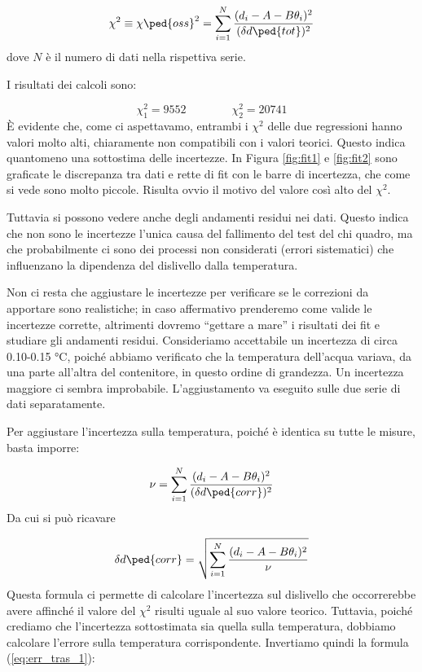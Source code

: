 \begin{equation}
    \chi^2 \equiv \chi\ped{oss}^2 = \sum_{i=1}^{N} \frac{(d_i - A - B\theta_i)^2}{(\delta d\ped{tot})^2}
    \label{eq:chi2}
\end{equation}
%
dove $N$ è il numero di dati nella rispettiva serie. 

I risultati dei calcoli sono:

\begin{equation}
    \chi_1^2 = 9552 \qquad \qquad \chi_2^2 = 20741
\end{equation}
%
\`E evidente che, come ci aspettavamo, entrambi i $\chi^2$ delle due regressioni hanno valori molto alti, chiaramente non compatibili con
i valori teorici. Questo indica quantomeno una sottostima delle incertezze. In Figura \ref{fig:fit1} e \ref{fig:fit2} sono
graficate le discrepanza tra dati e rette di fit con le barre di incertezza, che come si vede sono molto piccole. Risulta ovvio il motivo del
valore così alto del $\chi^2$.

Tuttavia si possono vedere anche degli andamenti residui nei dati. Questo indica che non sono le incertezze l'unica
causa del fallimento del test del chi quadro, ma che probabilmente ci sono dei processi non considerati (errori sistematici)
che influenzano la dipendenza del dislivello dalla temperatura.

Non ci resta che aggiustare le incertezze per verificare se le correzioni da apportare sono realistiche; in caso affermativo
prenderemo come valide le incertezze corrette, altrimenti dovremo ``gettare a mare'' i risultati dei fit e studiare gli
andamenti residui.
Consideriamo accettabile un incertezza di circa 0.10-0.15 \si{\celsius}, poiché abbiamo verificato che la temperatura dell'acqua
variava, da una parte all'altra del contenitore, in questo ordine di grandezza. Un incertezza maggiore ci sembra improbabile.
L'aggiustamento va eseguito sulle due serie di dati separatamente.

Per aggiustare l'incertezza sulla temperatura, poiché è identica su tutte le misure, basta imporre:

\begin{equation}
    \nu = \sum_{i=1}^{N} \frac{(d_i - A - B\theta_i)^2}{(\delta d\ped{corr})^2}
\end{equation}
%
Da cui si può ricavare

\begin{equation}
    \delta d\ped{corr} = \sqrt{\sum_{i=1}^{N} \frac{(d_i - A - B\theta_i)^2}{\nu}}
    \label{eq:corr_err}
\end{equation}
%
Questa formula ci permette di calcolare l'incertezza sul dislivello che occorrerebbe avere affinché il valore del $\chi^2$
risulti uguale al suo valore teorico. Tuttavia, poiché crediamo che l'incertezza sottostimata sia quella sulla temperatura,
dobbiamo calcolare l'errore sulla temperatura corrispondente. Invertiamo quindi la formula (\ref{eq:err_tras_1}):

